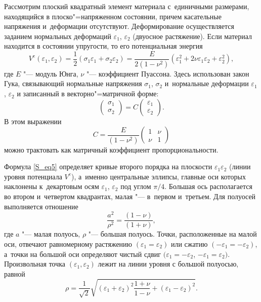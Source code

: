 Рассмотрим плоский квадратный элемент материала с~единичными размерами, находящийся в плоско"=напряженном состоянии, причем касательные напряжения и~деформации отсутствуют. 
Деформирование осуществляется заданием нормальных деформаций $ \varepsilon_1$, $\varepsilon_2 $ (двуосное растяжение). Если материал находится в состоянии упругости, то его  потенциальная энергия 
\begin{equation}\label{S_eq5}
V^e(\varepsilon_1, \varepsilon_2) = \frac{1}{2}(\sigma_1\varepsilon_1 + \sigma_2\varepsilon_2) = \frac{E}{2(1-\nu^2)} (\varepsilon^2_1 + 2\nu \varepsilon_1 \varepsilon_2 + \varepsilon^2_2 ) ,
\end{equation}
где $ E $ "--- модуль Юнга, $ \nu $ "--- коэффициент Пуассона. 
Здесь использован закон Гука, связывающий нормальные напряжения $ \sigma_1$, $\sigma_2 $ и~нормальные деформации $ \varepsilon_1$, $\varepsilon_2 $ и записанный в векторно"=матричной форме:
\begin{equation}\label{S_eq6}
\begin{pmatrix}
\sigma_1 \\ \sigma_2
\end{pmatrix}
 = C 
\begin{pmatrix} \varepsilon_1 \\ \varepsilon_2
\end{pmatrix}.
\end{equation}
В этом выражении 
$$
C = \frac{E}{(1-\nu^2)} \begin{pmatrix} 1 & \nu \\ \nu & 1 \end{pmatrix}
$$
можно трактовать как матричный коэффициент пропорциональности.

Формула \eqref{S_eq5} определяет кривые второго порядка на плоскости $\varepsilon_1 \varepsilon_2 $ 
(линии уровня потенциала $ V^e $), а~именно центральные эллипсы, главные оси которых наклонены к~декартовым осям $ \varepsilon_1$, $\varepsilon_2 $ под углом $ \pi/4 $. 
Большая ось располагается во втором и~четвертом квадрантах, малая "--- в~первом и~третьем. 
Для полуосей  выполняется отношение 
$$ \dfrac{a^{2}}{\rho^2} = \frac{(1-\nu)}{(1+\nu)}, $$ 
где $ a $ "--- малая полуось, $ \rho $ "--- большая полуось. 
Точки, расположенные на малой оси, отвечают равномерному растяжению $ (\varepsilon_1 = \varepsilon_2) $ или сжатию $ (-\varepsilon_1 = -\varepsilon_2) $, а~точки на большой оси определяют чистый сдвиг   
$ (\varepsilon_1 = -\varepsilon_2$, $ -\varepsilon_1 = \varepsilon_2 ) $. 
Произвольная точка  $ (\varepsilon_1,\varepsilon_2) $ лежит на линии уровня с большой полуосью, равной
\begin{equation}\label{S_eq7}
\rho = \frac{1}{\sqrt{2}}\sqrt{{(\varepsilon_1 + \varepsilon_2)}^2 \frac{1+\nu}{1-\nu} + {(\varepsilon_1 - \varepsilon_2)}^2} .
\end{equation}

